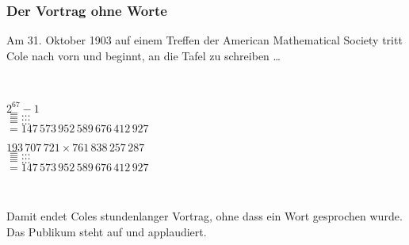 \documentclass[aspectratio=1610,onlymath]{beamer}
\begin{document}
\begin{frame}\frametitle{Der Vortrag ohne Worte}

Am 31. Oktober 1903 auf einem Treffen der American Mathematical Society tritt Cole nach vorn und beginnt,
an die Tafel zu schreiben \ldots \bigskip\pause

~\hfill
\begin{minipage}{6.5cm}
$2^{67}-1$\\\pause
$= \ldots$\\\pause
$= \ldots$\\\pause
$= \ldots$\\\pause
$= 147\,573\,952\,589\,676\,412\,927$\pause
\end{minipage}
\begin{minipage}{6.5cm}
$193\,707\,721 \times 761\,838\,257\,287$\\\pause
$= \ldots$\\\pause
$= \ldots$\\\pause
$= \ldots$\\\pause
$= 147\,573\,952\,589\,676\,412\,927$\pause
\end{minipage}
\hfill~
\bigskip

Damit endet Coles stundenlanger Vortrag, ohne dass ein Wort gesprochen wurde.\\
Das Publikum steht auf und applaudiert.

\end{frame}
\end{document}
